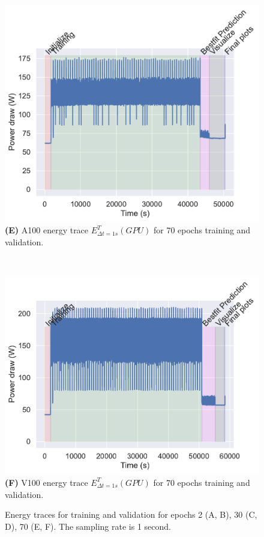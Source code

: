 \documentclass[utf8]{FrontiersinVancouver} %
\begin{document}
\begin{figure}[htb]
{\begin{center}
     \begin{minipage}[b]{0.43\textwidth}
       \includegraphics[width=1.0\linewidth]{images/a100-shaded-energy-70-epochs}
        {\bf (E)} A100 energy trace $E^T_{\Delta t=1s}(GPU)$ for 70 epochs training and validation.
     \end{minipage}
     \ \
     \begin{minipage}[b]{0.43\textwidth}
        \includegraphics[width=1.0\linewidth]{images/v100-shaded-energy-70-epochs}
        {\bf (F)}  V100 energy trace $E^T_{\Delta t=1s}(GPU)$ for 70 epochs training and validation.
     \end{minipage}
\end{center}
}
     \caption{Energy traces for training and validation for epochs 2 (A, B), 30 (C, D), 70 (E, F). The sampling rate is 1 second.}
     \label{fig:energy-graphs}
\end{figure}
\end{document}
